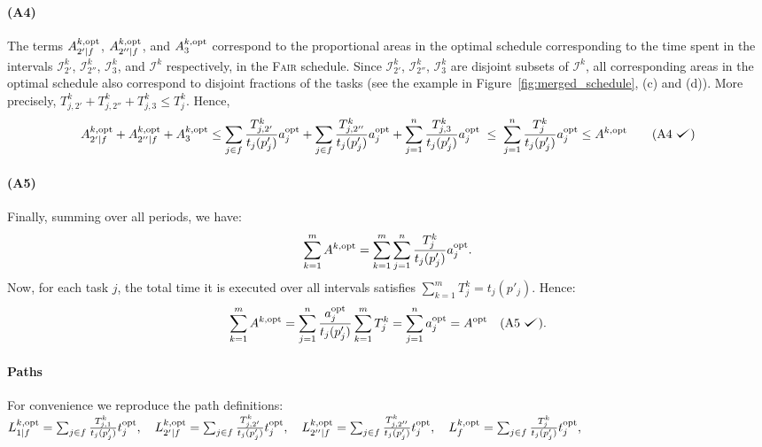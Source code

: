 \documentclass{article}
\def\checkmark{\tikz\fill[scale=0.4](0,.35) -- (.25,0) -- (1,.7) -- (.25,.15) -- cycle;}
\newcommand\fair{\textsc{Fair}\xspace}
\newcommand\opt{\textnormal{opt}\xspace}
\begin{document}
\paragraph{(A4)} The terms \(A_{2'|f}^{k,\opt}\), \(A_{2''|f}^{k,\opt}\), and \(A_3^{k,\opt}\) correspond to the proportional areas in the optimal schedule corresponding to the time spent in the intervals \(\mathcal{I}_{2'}^{k}\), \(\mathcal{I}_{2''}^{k}\), \(\mathcal{I}_{3}^{k}\), and \(\mathcal{I}^{k}\) respectively, in the \fair schedule. Since \(\mathcal{I}_{2'}^{k}\), \(\mathcal{I}_{2''}^{k}\), \(\mathcal{I}_{3}^{k}\) are disjoint subsets of \(\mathcal{I}^{k}\), all corresponding areas in the optimal schedule also correspond to disjoint fractions of the tasks (see the example in Figure~\ref{fig:merged_schedule}, (c) and (d)). More precisely, $T_{j,2'}^k+T_{j,2''}^{k}+T_{j,3}^{k} \leq T_{j}^{k}$. Hence,
\begin{equation}
 A^{k,\opt}_{2'|f} + A^{k,\opt}_{2''|f} + A^{k,\opt}_{3} \leq \sum_{j \in f} \frac{T_{j,2'}^{k}}{t_j(p'_j)} a_j^{\opt} 
+ \sum_{j \in f} \frac{T_{j,2''}^{k}}{t_j(p'_j)} a_j^{\opt} 
+ \sum_{j=1}^{n} \frac{T_{j,3}^{k}}{t_j(p'_j)} a_j^{\opt}
\;\le\;
\sum_{j=1}^{n} \frac{T_{j}^{k}}{t_j(p'_j)} a_j^{\opt} \leq A^{k,\opt} 
\tag{A4 \checkmark}
\end{equation}


\paragraph{(A5)} Finally, summing over all periods, we have:
\[
 \sum_{k=1}^m A^{k,\opt} = \sum_{k=1}^m \sum_{j=1}^{n} \frac{T_j^k}{t_j(p'_j)} a_j^{\opt}.
\]
Now, for each task \(j\), the total time it is executed over all intervals satisfies \(\sum_{k=1}^m T_j^k = t_j(p'_j)\). Hence:
\[
\sum_{k=1}^m A^{k,\opt} = \sum_{j=1}^n \frac{a_j^{\opt}}{t_j(p'_j)} \sum_{k=1}^m T_j^k = \sum_{j=1}^n a_j^{\opt} = A^{\opt} \quad \text{(A5 \checkmark)}.
\]

\paragraph{Paths} For convenience we reproduce the path definitions: \(
L^{k,\opt}_{1|f} = \sum_{j \in f} \frac{T_{j,1}^{k}}{t_j(p'_j)} t_j^{\opt},\quad
L^{k,\opt}_{2'|f} = \sum_{j \in f} \frac{T_{j,2'}^{k}}{t_j(p'_j)} t_j^{\opt},\quad
L^{k,\opt}_{2''|f} = \sum_{j \in f} \frac{T_{j,2''}^{k}}{t_j(p'_j)}  t_j^{\opt},\quad
L^{k,\opt}_{f} = \sum_{j \in f} \frac{T_{j}^{k}}{t_j(p'_j)}  t_j^{\opt},
\)
\end{document}
